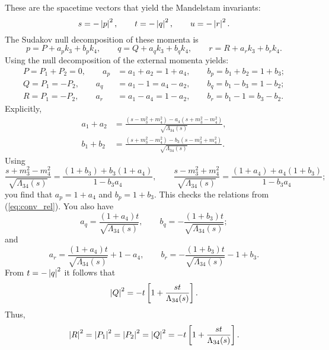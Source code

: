 These are the spacetime vectors that yield the Mandelstam invariants:
\begin{equation}
	s = -\left\lvert p \right\rvert^{2}, \qquad t = -\left\lvert q \right\rvert^{2}, \qquad u = -\left\lvert r \right\rvert^{2}.
\end{equation}
The Sudakov null decomposition of these momenta is
\begin{equation}
	p = P + a_{p} k_{3} + b_{p} k_{4}, \qquad q = Q + a_{q} k_{3} + b_{q} k_{4}, \qquad r = R + a_{r} k_{3} + b_{r} k_{4}.
\end{equation}
Using the null decomposition of the external momenta yields:
\begin{align}
	P = P_{1} + P_{2} = 0, \qquad a_{p} &= a_{1} + a_{2} = 1 + a_{4}, \qquad b_{p} = b_{1} + b_{2} = 1 + b_{3}; \\
	Q = P_{1} = -P_{2}, \qquad a_{q} &= a_{1} - 1 = a_{4} - a_{2}, \qquad b_{q} = b_{1} - b_{3} = 1 - b_{2}; \\
	R = P_{1} = -P_{2}, \qquad a_{r} &= a_{1} - a_{4} = 1 - a_{2}, \qquad b_{r} = b_{1} - 1 = b_{3} - b_{2}.
\end{align}
Explicitly,
\begin{align}
	a_{1} + a_{2} &= \frac{ \left(s - m_{3}^{2} + m_{4}^{2}\right) - a_{4} \left(s + m_{3}^{2} - m_{4}^{2} \right) }{\sqrt{\Lambda_{34}(s)}}, \\
	b_{1} + b_{2} &= \frac{ \left(s + m_{3}^{2} - m_{4}^{2}\right) - b_{3} \left(s - m_{3}^{2} + m_{4}^{2} \right) }{\sqrt{\Lambda_{34}(s)}}.
\end{align}
Using
\begin{equation}
	\frac{s + m_{3}^{2} - m_{4}^{2}}{\sqrt{\Lambda_{34}(s)}} = \frac{\left( 1 + b_{3} \right) + b_{3} \left( 1 + a_{4} \right)}{1 - b_{3} a_{4}}, \qquad \frac{s - m_{3}^{2} + m_{4}^{2}}{\sqrt{\Lambda_{34}(s)}} = \frac{\left( 1 + a_{4} \right) + a_{4} \left( 1 + b_{3} \right)}{1 - b_{3} a_{4}};
\end{equation}
you find that $a_{p} = 1 + a_{4}$ and $b_{p} = 1 + b_{3}$. This checks the relations from (\ref{eq:conv_rel}). You also have
\begin{equation}
	a_{q} = \frac{\left( 1 + a_{4} \right) t}{\sqrt{\Lambda_{34}(s)}}, \qquad
	b_{q} = -\frac{\left( 1 + b_{3} \right) t}{\sqrt{\Lambda_{34}(s)}};
\end{equation}
and
\begin{equation}
	a_{r} = \frac{\left( 1 + a_{4} \right) t}{\sqrt{\Lambda_{34}(s)}} + 1 - a_{4}, \qquad 
	b_{r} = - \frac{\left( 1 + b_{3} \right) t}{\sqrt{\Lambda_{34}(s)}} - 1 + b_{3}.
\end{equation}
From $t = -\left\lvert q \right\rvert^{2}$ it follows that
\begin{equation}
	\left\lvert Q \right\rvert^{2} = -t \left[ 1 + \frac{s t}{\Lambda_{34}(s)} \right].
\end{equation}
Thus,
\begin{equation}
	\left\lvert R \right\rvert^{2} = \left\lvert P_{1} \right\rvert^{2} = \left\lvert P_{2} \right\rvert^{2} = \left\lvert Q \right\rvert^{2} = -t \left[ 1 + \frac{s t}{\Lambda_{34}(s)} \right].
\end{equation}
